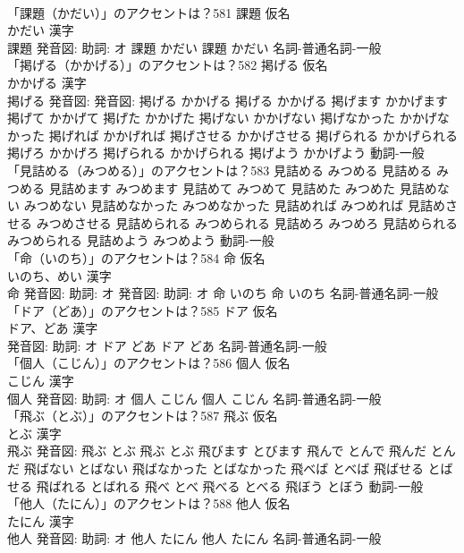 \documentclass[8pt]{extreport}
\begin{document}
\begin{CJK}{UTF8}{min}
\\	「課題（かだい）」のアクセントは？581	課題 仮名　
\\	かだい 漢字　
\\	課題 発音図: 助詞: オ	課題 かだい		課題 かだい				名詞-普通名詞-一般 
\\	「掲げる（かかげる）」のアクセントは？582	掲げる 仮名　
\\	かかげる 漢字　
\\	掲げる 発音図: 発音図:	掲げる かかげる		掲げる かかげる 掲げます かかげます 掲げて かかげて 掲げた かかげた 掲げない かかげない 掲げなかった かかげなかった 掲げれば かかげれば 掲げさせる かかげさせる 掲げられる かかげられる 掲げろ かかげろ 掲げられる かかげられる 掲げよう かかげよう				動詞-一般 
\\	「見詰める（みつめる）」のアクセントは？583		見詰める みつめる		見詰める みつめる 見詰めます みつめます 見詰めて みつめて 見詰めた みつめた 見詰めない みつめない 見詰めなかった みつめなかった 見詰めれば みつめれば 見詰めさせる みつめさせる 見詰められる みつめられる 見詰めろ みつめろ 見詰められる みつめられる 見詰めよう みつめよう				動詞-一般 
\\	「命（いのち）」のアクセントは？584	命 仮名　
\\	いのち、めい 漢字　
\\	命 発音図: 助詞: オ 発音図: 助詞: オ	命 いのち		命 いのち				名詞-普通名詞-一般 
\\	「ドア（どあ）」のアクセントは？585	ドア 仮名　
\\	ドア、どあ 漢字　
\\	発音図: 助詞: オ	ドア どあ		ドア どあ				名詞-普通名詞-一般 
\\	「個人（こじん）」のアクセントは？586	個人 仮名　
\\	こじん 漢字　
\\	個人 発音図: 助詞: オ	個人 こじん		個人 こじん				名詞-普通名詞-一般 
\\	「飛ぶ（とぶ）」のアクセントは？587	飛ぶ 仮名　
\\	とぶ 漢字　
\\	飛ぶ 発音図:	飛ぶ とぶ		飛ぶ とぶ 飛びます とびます 飛んで とんで 飛んだ とんだ 飛ばない とばない 飛ばなかった とばなかった 飛べば とべば 飛ばせる とばせる 飛ばれる とばれる 飛べ とべ 飛べる とべる 飛ぼう とぼう				動詞-一般 
\\	「他人（たにん）」のアクセントは？588	他人 仮名　
\\	たにん 漢字　
\\	他人 発音図: 助詞: オ	他人 たにん		他人 たにん				名詞-普通名詞-一般 

\end{CJK}
\end{document}
